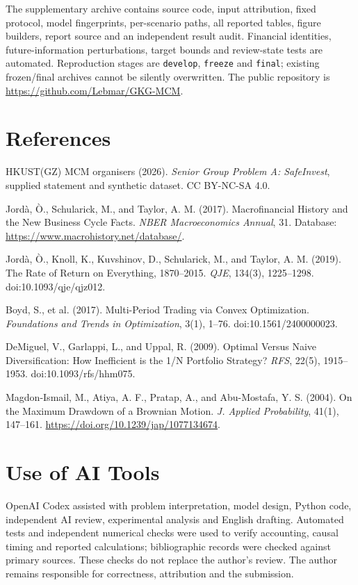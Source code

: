 \documentclass[11pt,a4paper]{article}
\begin{document}
The supplementary archive contains source code, input attribution, fixed
protocol, model fingerprints, per-scenario paths, all reported tables, figure
builders, report source and an independent result audit. Financial identities,
future-information perturbations, target bounds and review-state tests are
automated. Reproduction stages are \texttt{develop}, \texttt{freeze} and
\texttt{final}; existing frozen/final archives cannot be silently overwritten.
The public repository is \url{https://github.com/Lebmar/GKG-MCM}.

\section*{References}
\begin{enumerate}[label={[\arabic*]},itemsep=4pt]
\item HKUST(GZ) MCM organisers (2026). \emph{Senior Group Problem A:
SafeInvest}, supplied statement and synthetic dataset. CC BY-NC-SA 4.0.
\item Jord\`a, \`O., Schularick, M., and Taylor, A. M. (2017).
Macrofinancial History and the New Business Cycle Facts. \emph{NBER
Macroeconomics Annual}, 31. Database: \url{https://www.macrohistory.net/database/}.
\item Jord\`a, \`O., Knoll, K., Kuvshinov, D., Schularick, M., and Taylor,
A. M. (2019). The Rate of Return on Everything, 1870--2015.
\emph{QJE}, 134(3), 1225--1298. doi:10.1093/qje/qjz012.
\item Boyd, S., et al. (2017). Multi-Period Trading via Convex Optimization.
\emph{Foundations and Trends in Optimization}, 3(1), 1--76.
doi:10.1561/2400000023.
\item DeMiguel, V., Garlappi, L., and Uppal, R. (2009). Optimal Versus Naive
Diversification: How Inefficient is the 1/N Portfolio Strategy?
\emph{RFS}, 22(5), 1915--1953. doi:10.1093/rfs/hhm075.
\item Magdon-Ismail, M., Atiya, A. F., Pratap, A., and Abu-Mostafa, Y. S.
(2004). On the Maximum Drawdown of a Brownian Motion.
\emph{J. Applied Probability}, 41(1), 147--161.
\url{https://doi.org/10.1239/jap/1077134674}.
\end{enumerate}

\section*{Use of AI Tools}
OpenAI Codex assisted with problem interpretation, model design, Python code,
independent AI review, experimental analysis and English drafting. Automated
tests and independent numerical checks were used to verify accounting,
causal timing and reported calculations; bibliographic records were checked
against primary sources. These checks do not replace the author's review.
The author remains responsible for correctness, attribution and the submission.
\end{document}
